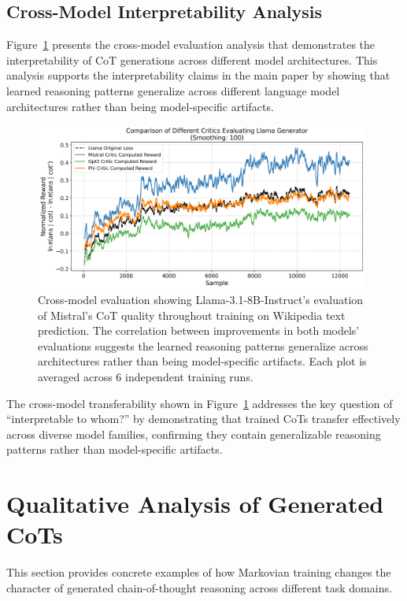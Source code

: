 \documentclass{article} %
\begin{document}
\subsection{Cross-Model Interpretability Analysis}
Figure~\ref{fig:wiki_cross_model} presents the cross-model evaluation analysis that demonstrates the interpretability of CoT generations across different model architectures. This analysis supports the interpretability claims in the main paper by showing that learned reasoning patterns generalize across different language model architectures rather than being model-specific artifacts.

\begin{figure}[ht]
    \centering
    \includegraphics[width=0.98\textwidth]{Figures/wiki_multi_critic_comparison.png}
    \caption{Cross-model evaluation showing Llama-3.1-8B-Instruct's evaluation of Mistral's CoT quality throughout training on Wikipedia text prediction. The correlation between improvements in both models' evaluations suggests the learned reasoning patterns generalize across architectures rather than being model-specific artifacts. Each plot is averaged across 6 independent training runs.}
    \label{fig:wiki_cross_model}
\end{figure}

The cross-model transferability shown in Figure~\ref{fig:wiki_cross_model} addresses the key question of ``interpretable to whom?'' by demonstrating that trained CoTs transfer effectively across diverse model families, confirming they contain generalizable reasoning patterns rather than model-specific artifacts.

\section{Qualitative Analysis of Generated CoTs}
This section provides concrete examples of how Markovian training changes the character of generated chain-of-thought reasoning across different task domains.
\end{document}
